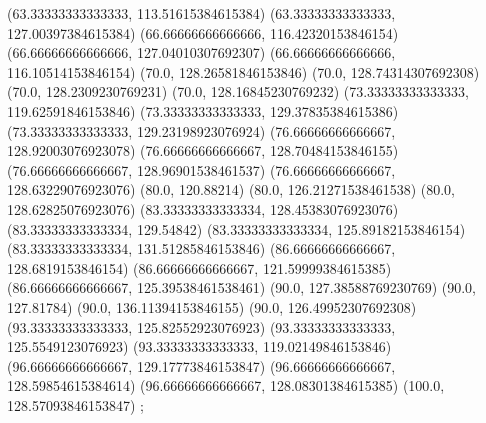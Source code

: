 {{{		(63.33333333333333, 113.51615384615384)
		(63.33333333333333, 127.00397384615384)
		(66.66666666666666, 116.42320153846154)
		(66.66666666666666, 127.04010307692307)
		(66.66666666666666, 116.10514153846154)
		(70.0, 128.26581846153846)
		(70.0, 128.74314307692308)
		(70.0, 128.2309230769231)
		(70.0, 128.16845230769232)
		(73.33333333333333, 119.62591846153846)
		(73.33333333333333, 129.37835384615386)
		(73.33333333333333, 129.23198923076924)
		(76.66666666666667, 128.92003076923078)
		(76.66666666666667, 128.70484153846155)
		(76.66666666666667, 128.96901538461537)
		(76.66666666666667, 128.63229076923076)
		(80.0, 120.88214)
		(80.0, 126.21271538461538)
		(80.0, 128.62825076923076)
		(83.33333333333334, 128.45383076923076)
		(83.33333333333334, 129.54842)
		(83.33333333333334, 125.89182153846154)
		(83.33333333333334, 131.51285846153846)
		(86.66666666666667, 128.6819153846154)
		(86.66666666666667, 121.59999384615385)
		(86.66666666666667, 125.39538461538461)
		(90.0, 127.38588769230769)
		(90.0, 127.81784)
		(90.0, 136.11394153846155)
		(90.0, 126.49952307692308)
		(93.33333333333333, 125.82552923076923)
		(93.33333333333333, 125.5549123076923)
		(93.33333333333333, 119.02149846153846)
		(96.66666666666667, 129.17773846153847)
		(96.66666666666667, 128.59854615384614)
		(96.66666666666667, 128.08301384615385)
		(100.0, 128.57093846153847)
	};

}
}

